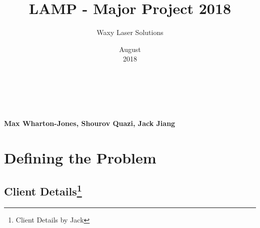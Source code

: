 \documentclass[oneside,openany,11pt,a4paper]{report}
\title{LAMP - Major Project 2018}
\date{August\\ 2018}
\author{Waxy Laser Solutions}
\begin{document}
	\begin{titlepage}
	\makeatletter
		\centering
		\vfill
		\vfill
		\vfill
		\vfill
		\vfill
		{\bfseries\Huge
				\@title \\
		}
			
			\vfill{
			\bfseries\huge \@author \\ \normalfont\huge Max Wharton-Jones, Shourov Quazi, Jack Jiang
		}
	\vfill{
			\huge{\@date}}

	
		
		\vfill
		\vfill
		\vfill
		
			\makeatother
	\end{titlepage}

	
	\newpage
	\tableofcontents
	
	

	

\chapter{Defining the Problem}
\section[Client Details]{Client Details\protect\footnote{Client Details by Jack}}
\end{document}
